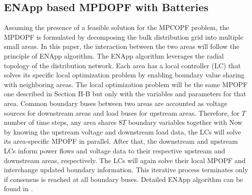 \documentclass[../../outputs/main.tex]{subfiles}
\begin{document}


\subsection{ENApp based MPDOPF with Batteries} \label{subsec:ENApp}
Assuming the presence of a feasible solution for the MPCOPF problem, the MPDOPF is formulated by decomposing the bulk distribution grid into multiple small areas. In this paper, the interaction between the two areas will follow the principle of ENApp algorithm. The ENApp algorithm leverages the radial topology of the distribution network. Each area has a local controller (LC) that solves its specific local optimization problem by enabling boundary value sharing with neighboring areas. The local optimization problem will be the same MPOPF one described in Section II-B but only with the variables and parameters for that area. Common boundary buses between two areas are accounted as voltage sources for downstream areas and load buses for upstream areas. Therefore, for $T$ number of time steps, any area shares $8T$ boundary variables together with Now by knowing the upstream voltage and downstream load data, the LCs will solve its area-specific MPOPF in parallel. After that, the downstream and upstream LCs inform power flows and voltage data to their respective upstream and downstream areas, respectively. The LCs will again solve their local MPOPF and interchange updated boundary information. This iterative process terminates only if consensus is reached at all boundary buses. Detailed ENApp algorithm can be found in \cite{Sadnan}.

\end{document}
